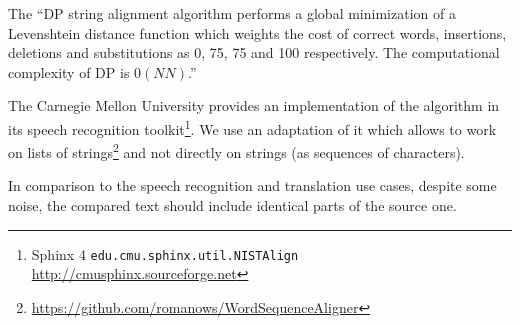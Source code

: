 The ``DP string alignment algorithm performs a global minimization of a Levenshtein distance function which weights the cost of correct words, insertions, deletions and substitutions as 0, 75, 75 and 100 respectively.
%
The computational complexity of DP is $0(NN)$.''






The Carnegie Mellon University provides an implementation of the algorithm in its speech recognition toolkit\footnote{Sphinx 4 \texttt{edu.cmu.sphinx.util.NISTAlign} %
\url{http://cmusphinx.sourceforge.net}}.
We use an adaptation of it which allows to work on lists of strings\footnote{\url{https://github.com/romanows/WordSequenceAligner}} and not directly on strings (as sequences of characters).



In comparison to the speech recognition and translation use cases, despite some noise, the compared text should include identical parts of the source one.





